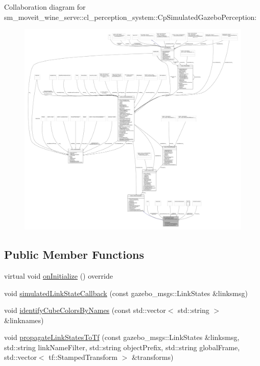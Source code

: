 Collaboration diagram for sm\+\_\+moveit\+\_\+wine\+\_\+serve\+:\+:cl\+\_\+perception\+\_\+system\+:\+:Cp\+Simulated\+Gazebo\+Perception\+:
\nopagebreak
\begin{figure}[H]
\begin{center}
\leavevmode
\includegraphics[width=350pt]{classsm__moveit__wine__serve_1_1cl__perception__system_1_1CpSimulatedGazeboPerception__coll__graph}
\end{center}
\end{figure}
\subsection*{Public Member Functions}
\begin{DoxyCompactItemize}
\item 
virtual void \hyperlink{classsm__moveit__wine__serve_1_1cl__perception__system_1_1CpSimulatedGazeboPerception_ad2360e1481edc4bd5732bb0e6deacea6}{on\+Initialize} () override
\item 
void \hyperlink{classsm__moveit__wine__serve_1_1cl__perception__system_1_1CpSimulatedGazeboPerception_a38e80c3c39a9cc20ddca22f9c5c5355b}{simulated\+Link\+State\+Callback} (const gazebo\+\_\+msgs\+::\+Link\+States \&linksmsg)
\item 
void \hyperlink{classsm__moveit__wine__serve_1_1cl__perception__system_1_1CpSimulatedGazeboPerception_a0a6d37ab728b459d96322cb4ef734f2a}{identify\+Cube\+Colors\+By\+Names} (const std\+::vector$<$ std\+::string $>$ \&linknames)
\item 
void \hyperlink{classsm__moveit__wine__serve_1_1cl__perception__system_1_1CpSimulatedGazeboPerception_ad5ba42ed951b2a1bd36c9eb13f9696e9}{propagate\+Link\+States\+To\+Tf} (const gazebo\+\_\+msgs\+::\+Link\+States \&linksmsg, std\+::string link\+Name\+Filter, std\+::string object\+Prefix, std\+::string global\+Frame, std\+::vector$<$ tf\+::\+Stamped\+Transform $>$ \&transforms)
\end{DoxyCompactItemize}
